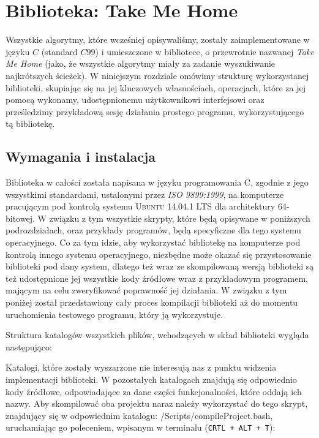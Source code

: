 \chapter{Biblioteka: Take Me Home}

Wszystkie algorytmy, które wcześniej opisywaliśmy, zostały zaimplementowane w języku $C$ (standard $C99$) i umieszczone w bibliotece, o przewrotnie nazwanej \textit{Take Me Home} (jako, że wszystkie algorytmy miały za zadanie wyszukiwanie najkrótszych ścieżek). W niniejszym rozdziale omówimy strukturę wykorzystanej biblioteki, skupiając się na jej kluczowych własnościach, operacjach, które za jej pomocą wykonamy, udostępnionemu użytkownikowi interfejsowi oraz prześledzimy przykładową sesję działania prostego programu, wykorzystującego tą bibliotekę.

\section{Wymagania i instalacja}

Biblioteka w całości została napisana w języku programowania \textsc{C}, zgodnie z jego wszystkimi standardami, ustalonymi przez \textit{\textsc{ISO 9899:1999}}, na komputerze pracującym pod kontrolą systemu \textsc{Ubuntu 14.04.1 LTS} dla architektury \textsc{64}-bitowej. W związku z tym wszystkie skrypty, które będą opisywane w poniższych podrozdziałach, oraz przykłady programów, będą specyficzne dla tego systemu operacyjnego. Co za tym idzie, aby wykorzystać bibliotekę na komputerze pod kontrolą innego systemu operacyjnego, niezbędne może okazać się przystosowanie biblioteki pod dany system, dlatego też wraz ze skompilowaną wersją biblioteki są też udostępnione jej wszystkie kody źródłowe wraz z przykładowym programem, mającym na celu zweryfikować poprawność jej działania. W związku z tym poniżej został przedstawiony cały proces kompilacji biblioteki aż do momentu uruchomienia testowego programu, który ją wykorzystuje.

Struktura katalogów wszystkich plików, wchodzących w skład biblioteki wygląda następująco:


Katalogi, które zostały wyszarzone nie interesują nas z punktu widzenia implementacji biblioteki. W pozostałych katalogach znajdują się odpowiednio kody źródłowe, odpowiadające za dane części funkcjonalności, które oddają ich nazwy. Aby skompilować oba projektu naraz należy wykorzystać do tego skrypt, znajdujący się w odpowiednim katalogu: \textsf{/Scripts/compileProject.bash}, uruchamiając go poleceniem, wpisanym w terminalu (\texttt{CRTL + ALT + T}):

